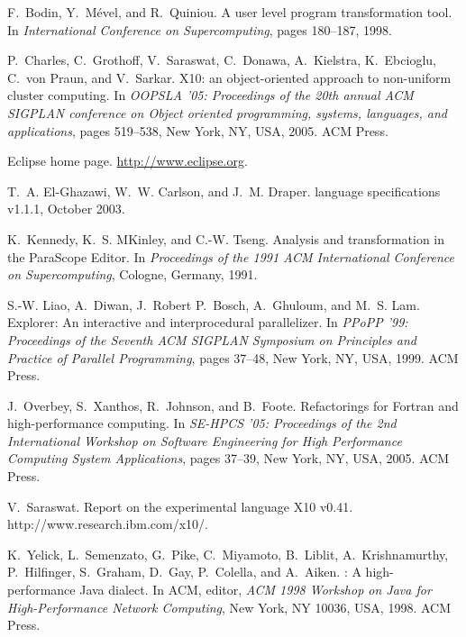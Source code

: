 \documentclass[natbib]{sigplanconf}
\begin{document}

\begin{thebibliography}{99}

F.~Bodin, Y.~M{\'e}vel, and R.~Quiniou.
\newblock A user level program transformation tool.
\newblock In {\em International Conference on Supercomputing}, pages 180--187,
  1998.

P.~Charles, C.~Grothoff, V.~Saraswat, C.~Donawa, A.~Kielstra, K.~Ebcioglu,
  C.~von Praun, and V.~Sarkar.
\newblock X10: an object-oriented approach to non-uniform cluster computing.
\newblock In {\em OOPSLA '05: Proceedings of the 20th annual ACM SIGPLAN
  conference on Object oriented programming, systems, languages, and
  applications}, pages 519--538, New York, NY, USA, 2005. ACM Press.

{Eclipse} home page.
\newblock \url{http://www.eclipse.org}.

T.~A. El-Ghazawi, W.~W. Carlson, and J.~M. Draper.
 language specifications v1.1.1, October 2003.

K.~Kennedy, K.~S. M\raisebox{.2em}{c}Kinley, and C.-W. Tseng.
\newblock Analysis and transformation in the {Para{Scope} {Editor}}.
\newblock In {\em Proceedings of the 1991 {ACM} International Conference on
  Supercomputing}, Cologne, Germany, 1991.

S.-W. Liao, A.~Diwan, J.~Robert P.~Bosch, A.~Ghuloum, and M.~S. Lam.
 {Explorer}: An interactive and interprocedural
  parallelizer.
\newblock In {\em PPoPP '99: Proceedings of the Seventh ACM SIGPLAN Symposium
  on Principles and Practice of Parallel Programming}, pages 37--48, New York,
  NY, USA, 1999. ACM Press.

J.~Overbey, S.~Xanthos, R.~Johnson, and B.~Foote.
\newblock Refactorings for {Fortran} and high-performance computing.
\newblock In {\em SE-HPCS '05: Proceedings of the 2nd International Workshop on
  Software Engineering for High Performance Computing System Applications},
  pages 37--39, New York, NY, USA, 2005. ACM Press.

V.~Saraswat.
\newblock Report on the experimental language {X10} v0.41.
\newblock http://www.research.ibm.com/x10/.

K.~Yelick, L.~Semenzato, G.~Pike, C.~Miyamoto, B.~Liblit, A.~Krishnamurthy,
  P.~Hilfinger, S.~Graham, D.~Gay, P.~Colella, and A.~Aiken.
: {A} high-performance {Java} dialect.
\newblock In {ACM}, editor, {\em {ACM} 1998 Workshop on Java for
  High-Performance Network Computing}, New York, NY 10036, USA, 1998. ACM
  Press.

\end{thebibliography}
\end{document}
